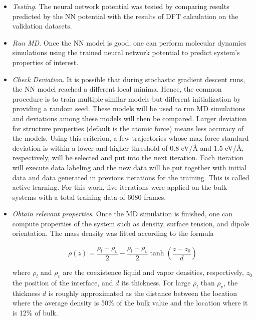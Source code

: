 \begin{itemize}
    \item \emph{Testing}. The neural network potential was tested by
          comparing results predicted by the NN potential with	  the results
          of DFT
          calculation on the validation datasets.

    \item \emph{Run MD}. Once the NN model is good, one can perform molecular
          dynamics simulations using the trained neural   network potential to
          predict
          system's properties of interest.

    \item \emph{Check Deviation}. It is possible that during stochastic
          gradient descent runs, the NN model reached a different local minima.
          Hence,
          the common procedure is to train multiple similar models but
          different
          initialization by providing a  random seed. These models will be used
          to run MD simulations and deviations among these models will then be
          compared. Larger deviation for structure properties (default is the
          atomic
          force) means less accuracy of the models. Using this criterion, a few
          trajectories whose max force standard deviation is within a lower and
          higher
          threshold of 0.8 \unit{eV/\angstrom} and 1.5	\unit{eV/\angstrom},
          respectively,
          will be selected and put into the next iteration. Each iteration will
          execute data labeling  and  the new data will be put together with
          initial data
          and data generated in previous iterations for the training. This is
          called active learning. For this work, five iterations were applied
          on
          the bulk
          systems with a total training data of 6080 frames.

    \item \emph{Obtain relevant properties}. Once the MD
          simulation is
          finished, one can compute properties of the system such as density,
          surface
          tension, and dipole orientation.	 The mass density was fitted according to the formula \cite{sanchez2023deep}

          \begin{equation}
              \rho(z) = \frac{\rho_l+\rho_v}{2} -  \frac{\rho_l-\rho_v}{2} \tanh\left(\frac{z-z_0}{d} \right)
              \label{eq:fit_dens}
          \end{equation}

          where  $\rho_l$ and $\rho_v$ are the  coexistence liquid and vapor densities, respectively,  $z_0$ the position of the interface, and $d$ its thickness. For large $\rho_l$ than  $\rho_v$,  the thickness $d$ is roughly approximated as the distance between the location where the average density is 50\% of the bulk value and the location where it is 12\% of bulk.



\end{itemize}

